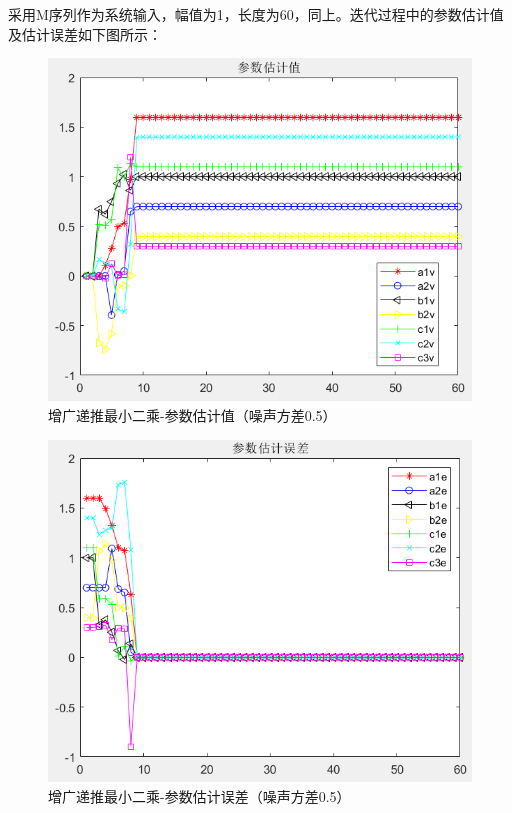 \documentclass[UTF8]{article}
\begin{document}
采用M序列作为系统输入，幅值为1，长度为60，同上。迭代过程中的参数估计值及估计误差如下图所示：
\begin{figure}[H]
    \centering %
    \includegraphics[width=.8\textwidth]{figure/增广递推最小二乘-参数估计值（方差0.5）.png} 
    \caption{增广递推最小二乘-参数估计值（噪声方差0.5）} %
\end{figure}
\begin{figure}[H]
    \centering %
    \includegraphics[width=.8\textwidth]{figure/增广递推最小二乘-参数估计误差（方差0.5）.png} 
    \caption{增广递推最小二乘-参数估计误差（噪声方差0.5）} %
\end{figure}
\end{document}
